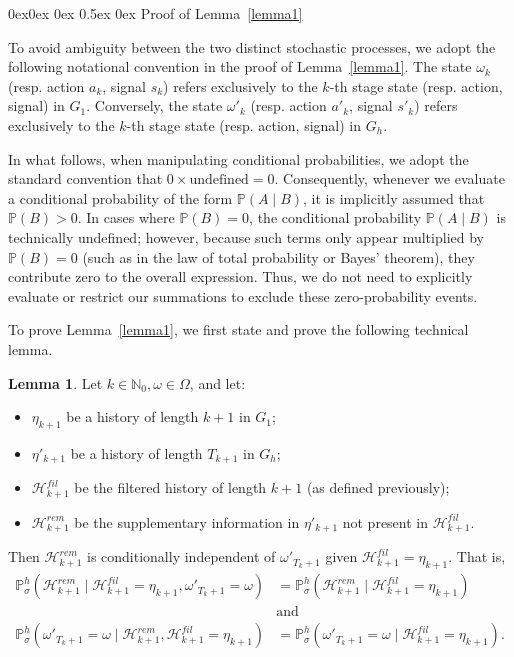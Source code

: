 \documentclass[english,openary,11pt]{article}
\makeatletter
\renewcommand\subsection{\@startsection{subsection}{2}{\z@}%
                                     {0ex\@plus 0ex \@minus 0ex}%
                                     {0.5ex \@plus 0ex}%
                                     {\normalfont\Large\bfseries}}%
\theoremstyle{definition}
\newtheorem{lemma}{Lemma}
\newcommand{\N}{\mathbb{N}}
\renewcommand{\P}{\mathbb{P}}
\makeatother
\begin{document}
\subsection{Proof of Lemma~\ref{lemma1}}

To avoid ambiguity between the two distinct stochastic processes, we adopt the following notational convention in the proof of Lemma~\ref{lemma1}. 
The state $\omega_{k}$ (resp. action $a_{k}$, signal $s_{k}$) refers exclusively to the $k$-th stage state (resp. action, signal) in $G_{1}$.
Conversely, the state $\omega'_{k}$ (resp. action $a'_{k}$, signal $s'_{k}$) refers exclusively to the $k$-th stage state (resp. action, signal) in $G_{h}$.

In what follows, when manipulating conditional probabilities, we adopt the standard convention that $0 \times \text{undefined} = 0$. Consequently, whenever we evaluate a conditional probability of the form $\mathbb{P}(A \mid B)$, it is implicitly assumed that $\mathbb{P}(B) > 0$. In cases where $\mathbb{P}(B) = 0$, the conditional probability $\mathbb{P}(A \mid B)$ is technically undefined; however, because such terms only appear multiplied by $\mathbb{P}(B) = 0$ (such as in the law of total probability or Bayes' theorem), they contribute zero to the overall expression. Thus, we do not need to explicitly evaluate or restrict our summations to exclude these zero-probability events.

To prove Lemma~\ref{lemma1}, we first state and prove the following technical lemma.

\begin{lemma}
Let $k \in \N_0, \omega \in \Omega$, and let: 
\begin{itemize}
	\item $\eta_{k+1}$ be a history of length $k+1$ in $G_1$;
	\item $\eta'_{k+1}$ be a history of length $T_{k+1}$ in $G_h$;
	\item $\mathcal H^{fil}_{k+1}$ be the filtered history of length $k+1$ (as defined previously);
	\item $\mathcal H^{rem}_{k+1}$ be the supplementary information in $\eta'_{k+1}$ not present in $\mathcal{H}_{k+1}^{fil}$.
\end{itemize}

Then $\mathcal{H}_{k+1}^{rem}$ is conditionally independent of $\omega'_{T_{k}+1}$ given $\mathcal H^{fil}_{k+1} = \eta_{k+1}$. That is,
	\begin{align*}
		\P_{\sigma}^h (\mathcal H^{rem}_{k+1} \mid \mathcal H^{fil}_{k+1} = \eta_{k+1}, \omega'_{T_k + 1} = \omega) &= \P_{\sigma}^h (\mathcal H^{rem}_{k+1} \mid \mathcal H^{fil}_{k+1} = \eta_{k+1})\\
		&\text{and}\\
		\P_{\sigma}^h(\omega'_{T_{k}+1} = \omega \mid \mathcal{H}_{k+1}^{rem}, \mathcal H^{fil}_{k+1} = \eta_{k+1}) &= \P_{\sigma}^h(\omega'_{T_{k}+1} = \omega \mid \mathcal H^{fil}_{k+1} = \eta_{k+1}).
	\end{align*}
\label{aux-lemma}
\end{lemma}
\end{document}
